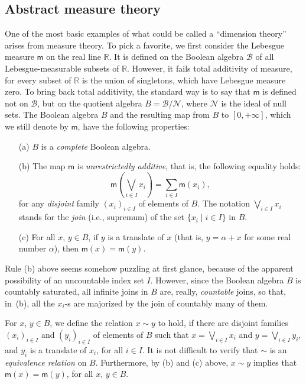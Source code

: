 \documentclass[psamsfonts,reqno]{memo-l}
\theoremstyle{plain}
\theoremstyle{definition}
\theoremstyle{remark}
\numberwithin{equation}{section}
\newcommand{\mm}{\mathsf{m}}
\newcommand{\RR}{\mathbb{R}}
\newcommand{\set}[1]{\{#1\}}
\newcommand{\setm}[2]{\set{#1\mid#2}}
\newcommand{\famm}[2]{(#1)_{#2}}
\begin{document}
\subsection{Abstract measure theory}\label{Su:AMeasTh}
One of the most basic examples of what could be called a ``dimension theory''
arises from measure theory. To pick a favorite, we first consider
the Lebesgue measure
$\mm$ on the real line $\RR$. It is defined on
the Boolean algebra $\mathcal{B}$ of all
Lebesgue-measurable subsets of
$\RR$. However, it fails total additivity of measure, for every subset of
$\RR$ is the union of singletons, which have Lebesgue measure zero. To bring
back total additivity, the standard way is to say that $\mm$ is defined not on
$\mathcal{B}$, but on the quotient algebra $B=\mathcal{B}/\mathcal{N}$,
where $\mathcal{N}$ is the ideal of null sets.
The Boolean algebra $B$ and the resulting map from
$B$ to $[0,+\infty]$, which we still denote by $\mm$, have the following
properties:
\begin{itemize}
\item[(a)] $B$ is a \emph{complete}
Boolean algebra.

\item[(b)] The map $\mm$ is \emph{unrestrictedly additive},
 that is,
the following equality holds:
   \[
   \mm\left(\bigvee_{i\in I}x_i\right)=\sum_{i\in I}\mm(x_i),
   \]
for any \emph{disjoint} family $\famm{x_i}{i\in I}$ of elements of $B$.
The notation $\bigvee_{i\in I}x_i$ stands for the \emph{join} (i.e.,
supremum) of the set $\setm{x_i}{i\in I}$ in $B$.

\item[(c)] For all $x$, $y\in B$, if $y$ is a translate of $x$ (that is,
$y=\alpha+x$ for some real number $\alpha$), then
$\mm(x)=\mm(y)$.
\end{itemize}

Rule (b) above seems somehow puzzling at first glance, because of the
apparent possibility of an uncountable index set $I$. However, since the
Boolean algebra $B$ is countably saturated, all
infinite joins in $B$ are, really, \emph{countable} joins, so that, in~(b),
all the $x_i$-s are majorized by the join of countably many of them.

For $x$, $y\in B$, we define the relation $x\sim y$ to hold, if there
are disjoint families $\famm{x_i}{i\in I}$ and $\famm{y_i}{i\in I}$ of
elements of $B$ such that $x=\bigvee_{i\in I}x_i$ and
$y=\bigvee_{i\in I}y_i$, and $y_i$ is a translate of $x_i$, for all
$i\in I$. It is not difficult to verify that $\sim$ is an \emph{equivalence
relation} on $B$. Furthermore, by (b) and (c) above, $x\sim y$ implies
that $\mm(x)=\mm(y)$, for all $x$, $y\in B$.
\end{document}
